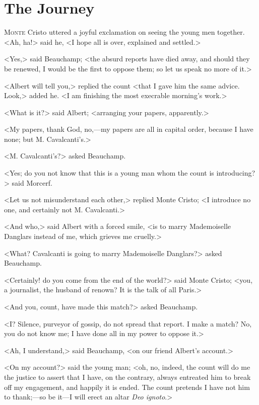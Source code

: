 \chapter{The Journey} 

 \lettrine{M}{onte} Cristo uttered a joyful exclamation on seeing the young men together. <Ah, ha!> said he, <I hope all is over, explained and settled.> 

 <Yes,> said Beauchamp; <the absurd reports have died away, and should they be renewed, I would be the first to oppose them; so let us speak no more of it.> 

 <Albert will tell you,> replied the count <that I gave him the same advice. Look,> added he. <I am finishing the most execrable morning's work.> 

 <What is it?> said Albert; <arranging your papers, apparently.> 

 <My papers, thank God, no,—my papers are all in capital order, because I have none; but M. Cavalcanti's.> 

 <M. Cavalcanti's?> asked Beauchamp. 

 <Yes; do you not know that this is a young man whom the count is introducing?> said Morcerf. 

 <Let us not misunderstand each other,> replied Monte Cristo; <I introduce no one, and certainly not M. Cavalcanti.> 

 <And who,> said Albert with a forced smile, <is to marry Mademoiselle Danglars instead of me, which grieves me cruelly.> 

 <What? Cavalcanti is going to marry Mademoiselle Danglars?> asked Beauchamp. 

 <Certainly! do you come from the end of the world?> said Monte Cristo; <you, a journalist, the husband of renown? It is the talk of all Paris.> 

 <And you, count, have made this match?> asked Beauchamp. 

 <I? Silence, purveyor of gossip, do not spread that report. I make a match? No, you do not know me; I have done all in my power to oppose it.> 

 <Ah, I understand,> said Beauchamp, <on our friend Albert's account.> 

 <On my account?> said the young man; <oh, no, indeed, the count will do me the justice to assert that I have, on the contrary, always entreated him to break off my engagement, and happily it is ended. The count pretends I have not him to thank;—so be it—I will erect an altar \textit{Deo ignoto}.> 

